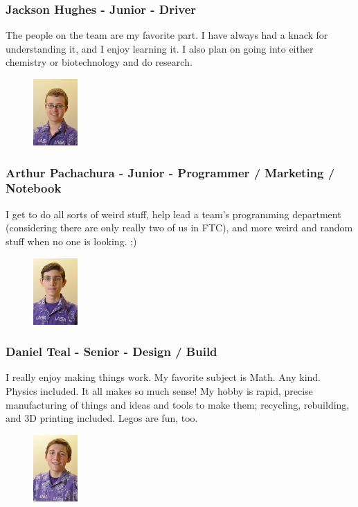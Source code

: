 \subsubsection{Jackson Hughes - Junior - Driver} 
The people on the team are my favorite part.  I have always had a knack for understanding it, and I enjoy learning it. I also plan on going into either chemistry or biotechnology and do research.

\begin{figure}
	\color{darkgray}
	\centering
	\includegraphics[height=1in]{arthur}
\end{figure}
\subsubsection{Arthur Pachachura - Junior - Programmer /  Marketing / Notebook} 
I get to do all sorts of weird stuff, help lead a team's programming department (considering there are only really two of us in FTC), and more weird and random stuff when no one is looking. ;)

\begin{figure}
	\color{darkgray}
	\centering
	\includegraphics[height=1in]{daniel}
\end{figure}
\subsubsection{Daniel Teal - Senior - Design / Build} 
I really enjoy making things work.  My favorite subject is Math. Any kind. Physics included. It all makes so much sense!  My hobby is rapid, precise manufacturing of things and ideas and tools to make them; recycling, rebuilding, and 3D printing included. Legos are fun, too.

\begin{figure}
	\color{darkgray}
	\centering
	\includegraphics[height=1in]{marek}
\end{figure}
